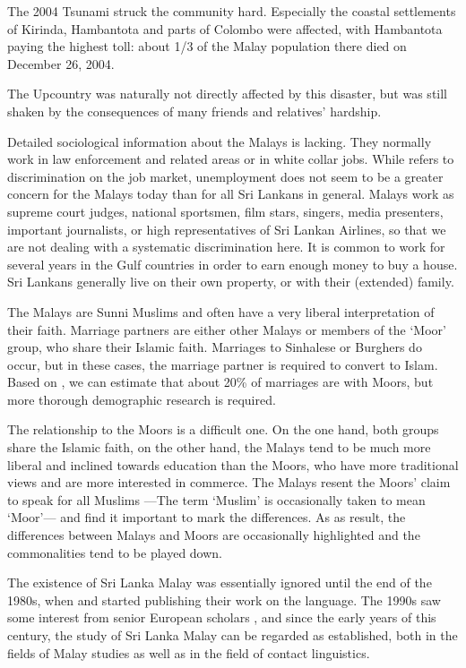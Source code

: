 The 2004 Tsunami struck the community hard. Especially the coastal settlements of Kirinda, Hambantota and parts of Colombo were affected, with Hambantota paying the highest toll: about 1/3 of the Malay population there died on December 26, 2004.

The Upcountry was naturally not directly affected by this disaster, but was still shaken by the consequences of many friends and relatives' hardship.


Detailed sociological information about the Malays is lacking. They normally work in law enforcement and related areas or in white collar jobs. 
While \citet{Bichsel1989} refers to discrimination on the job market, unemployment does not seem to be a greater concern for the Malays today than for all Sri Lankans in general. Malays work as supreme court judges, national sportsmen, film stars, singers, media presenters, important journalists, or high representatives of Sri Lankan Airlines, so that we are not dealing with a systematic discrimination here. 
It is common to work for several years in the Gulf countries in order to earn enough money to buy a house. Sri Lankans generally live on their own property, or with their (extended) family.  

The Malays are Sunni Muslims and often have a very liberal interpretation of their faith. Marriage partners are either other Malays or members of the `Moor' group, who share their Islamic faith. Marriages to Sinhalese or Burghers do occur, but in these cases, the marriage partner is required to convert to Islam. Based on \citet{Nordhoff2009}, we can estimate that about 20\% of marriages are with Moors, but more thorough demographic research is required. 

The relationship to the Moors is a difficult one. On the one hand, both groups share the Islamic faith, on the other hand, the Malays tend to be  much more liberal and inclined towards education than the Moors, who have more traditional views and are more interested in commerce. The Malays resent the Moors' claim to speak for all Muslims ---The term `Muslim' is occasionally taken to mean `Moor'--- and find it important to mark the differences. As as result, the differences between Malays and Moors are occasionally highlighted and the commonalities tend to be played down.

The existence of Sri Lanka Malay was essentially ignored until the end of the 1980s, when \citet{Hussainmiya1987,Hussainmiya1990} and \citet{Bichsel1989} started publishing their work on the language. The 1990s saw some interest from senior European scholars \citep{Adelaar1991,Bakker1995nl,AdelaarEtAl1996}, and since the early years of this century, the study of Sri Lanka Malay can be regarded as established, both in the fields of Malay studies as well as in the field of contact linguistics.


